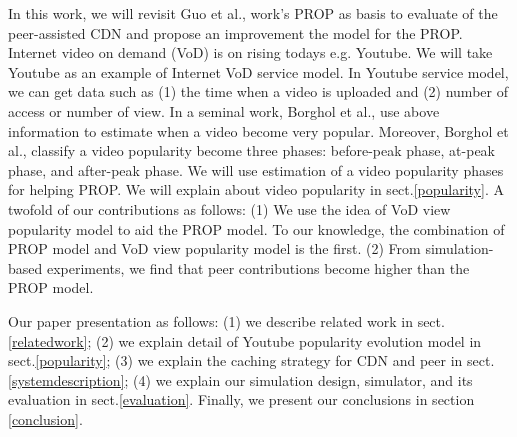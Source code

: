 \documentclass[10pt,final,journal,a4paper]{IEEEtran}
\begin{document}
In this work, we will revisit Guo et al., \cite{1613869} work's PROP as basis to evaluate of the peer-assisted CDN and propose an improvement the model for the PROP.
Internet video on demand (VoD) is on rising todays e.g. Youtube.
We will take Youtube as an example of Internet VoD service model.
In Youtube service model, we can get data such as (1) the time when a video is uploaded and (2) number of access or number of view.
In a seminal work, Borghol et al., \cite{Borghol:2011:CMP:2039452.2039717} use above information to estimate when a video become very popular.
Moreover, Borghol et al., \cite{Borghol:2011:CMP:2039452.2039717} classify a video popularity become three phases: before-peak phase, at-peak phase, and after-peak phase.
We will use estimation of a video popularity phases for helping PROP.
We will explain about video popularity in sect.\ref{popularity}.
A twofold of our contributions as follows:
(1) We use the idea of VoD view popularity model to aid the PROP model. 
To our knowledge, the combination of PROP model and VoD view popularity model is the first.
(2) From simulation-based experiments, we find that peer contributions become higher than the PROP model.

Our paper presentation as follows: (1) we describe related work in sect.\ref{relatedwork}; (2) we explain detail of Youtube popularity evolution model in sect.\ref{popularity}; (3) we explain the caching strategy for CDN and peer in sect.\ref{systemdescription}; (4) we explain our simulation design, simulator, and its evaluation in sect.\ref{evaluation}.
Finally, we present our conclusions in section \ref{conclusion}.
\end{document}
